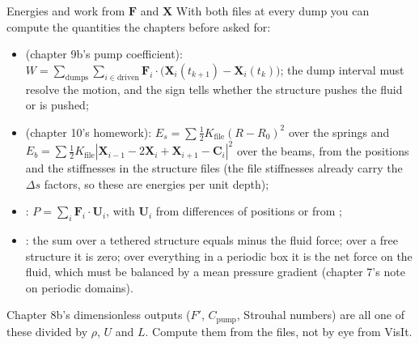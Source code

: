 \documentclass[aspectratio=169,11pt]{beamer}
\begin{document}
\begin{frame}{Energies and work from $\mathbf{F}$ and $\mathbf{X}$}
\label{fr:energy}
\small With both files at every dump you can compute the quantities the chapters before asked for:
\begin{itemize}
  \item {} (chapter 9b's pump coefficient): $W = \sum_{\mathrm{dumps}}\sum_{i \in \mathrm{driven}} \mathbf{F}_i\cdot\big(\mathbf{X}_i(t_{k+1}) - \mathbf{X}_i(t_k)\big)$; the dump interval must resolve the motion, and the sign tells whether the structure pushes the fluid or is pushed;
  \item {} (chapter 10's homework): $E_s = \sum \frac12 K_{\mathrm{file}}(R - R_0)^2$ over the springs and $E_b = \sum \frac12 K_{\mathrm{file}}|\mathbf{X}_{i-1} - 2\mathbf{X}_i + \mathbf{X}_{i+1} - \mathbf{C}_i|^2$ over the beams, from the positions and the stiffnesses in the structure files (the file stiffnesses already carry the $\Delta s$ factors, so these are energies per unit depth);
  \item {}: $P = \sum_i \mathbf{F}_i\cdot\mathbf{U}_i$, with $\mathbf{U}_i$ from differences of positions or from ;
  \item {}: the sum over a tethered structure equals minus the fluid force; over a free structure it is zero; over everything in a periodic box it is the net force on the fluid, which must be balanced by a mean pressure gradient (chapter 7's note on periodic domains).
\end{itemize}
\vspace{1mm}
\begin{punchbox}
\footnotesize Chapter 8b's dimensionless outputs ($F'$, $C_{\mathrm{pump}}$, Strouhal numbers) are all one of these divided by $\rho$, $U$ and $L$. Compute them from the files, not by eye from VisIt.
\end{punchbox}
\end{frame}
\end{document}
